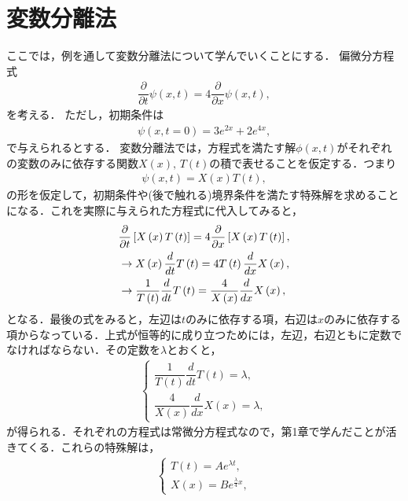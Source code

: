 \section{変数分離法}
%
ここでは，例を通して変数分離法について学んでいくことにする．
偏微分方程式
\begin{align}
\dfrac{\partial}{\partial t}\psi\left(x,t\right)	=4\dfrac{\partial}{\partial x}\psi\left(x,t\right),
\end{align}
を考える．
ただし，初期条件は
\begin{align}
\psi\left(x,t=0\right)	=3e^{2x}+2e^{4x},
\end{align}
で与えられるとする．
変数分離法では，方程式を満たす解$\phi\left(x,t\right)$がそれぞれの変数のみに依存する関数$X\left(x\right),\,T\left(t \right)$の積で表せることを仮定する．つまり
\begin{align}
\psi\left(x,t\right)	=X\left(x\right)T\left(t\right),
\end{align}
の形を仮定して，初期条件や(後で触れる)境界条件を満たす特殊解を求めることになる．これを実際に与えられた方程式に代入してみると，
\begin{align}
&\dfrac{\partial}{\partial t}\left[X\left(x\right)T\left(t\right)\right]=4\dfrac{\partial}{\partial x}\left[X\left(x\right)T\left(t\right)\right],\notag \\
&\to X\left(x\right)\dfrac{d}{dt}T\left(t\right)=4T\left(t\right)\dfrac{d}{dx}X\left(x\right),\notag \\
&\to\dfrac{1}{T\left(t\right)}\dfrac{d}{dt}T\left(t\right)=\dfrac{4}{X\left(x\right)}\dfrac{d}{dx}X\left(x\right),
\end{align}
となる．最後の式をみると，左辺は$t$のみに依存する項，右辺は$x$のみに依存する項からなっている．上式が恒等的に成り立つためには，左辺，右辺ともに定数でなければならない．その定数を$\lambda$とおくと，
\begin{align}
\begin{cases}
\dfrac{1}{T\left(t\right)}\dfrac{d}{dt}T\left(t\right)=\lambda,\\[.4cm]
\dfrac{4}{X\left(x\right)}\dfrac{d}{dx}X\left(x\right)=\lambda,
\end{cases}
\end{align}
が得られる．それぞれの方程式は常微分方程式なので，第1章で学んだことが活きてくる．これらの特殊解は，
\begin{align}
\begin{cases}
T\left(t\right)=Ae^{\lambda t},\\
X\left(x\right)=Be^{\frac{\lambda}{4}x},
\end{cases}
\end{align}
